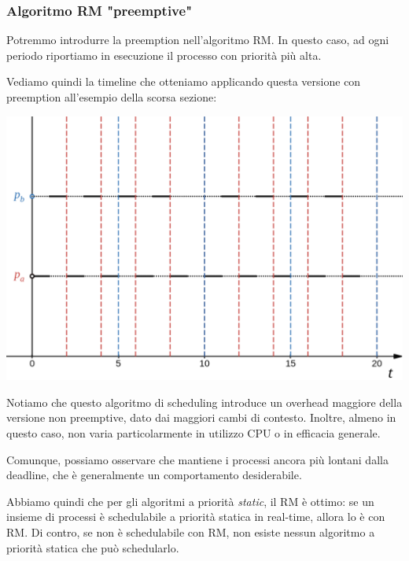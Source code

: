 \documentclass[a4paper,11pt]{article}
\begin{document}
\subsubsection{Algoritmo RM "preemptive"}
Potremmo introdurre la preemption nell'algoritmo RM.
In questo caso, ad ogni periodo riportiamo in esecuzione il processo con priorità più alta.

\par\smallskip

Vediamo quindi la timeline che otteniamo applicando questa versione con preemption all'esempio della scorsa sezione: 
\begin{center}
	\includegraphics[scale=0.3]{../figures/rm_pre.png}
\end{center}

\par\smallskip

Notiamo che questo algoritmo di scheduling introduce un overhead maggiore della versione non preemptive, dato dai maggiori cambi di contesto. Inoltre, almeno in questo caso, non varia particolarmente in utilizzo CPU o in efficacia generale.

Comunque, possiamo osservare che mantiene i processi ancora più lontani dalla deadline, che è generalmente un comportamento desiderabile. 

\par\smallskip

Abbiamo quindi che per gli algoritmi a priorità \textit{static}, il RM è ottimo: se un insieme di processi è schedulabile a priorità statica in real-time, allora lo è con RM.
Di contro, se non è schedulabile con RM, non esiste nessun algoritmo a priorità statica che può schedularlo.
\end{document}
